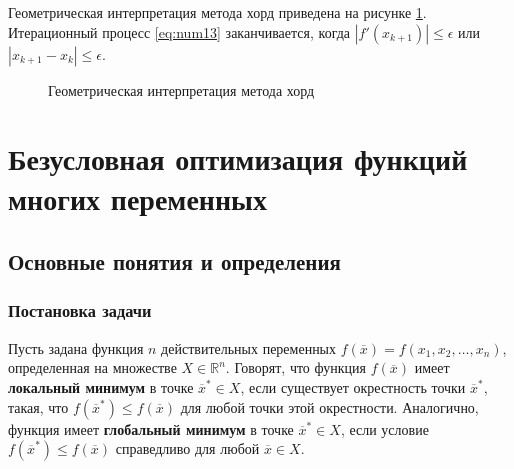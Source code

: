 \documentclass[a4paper,12pt]{report}
\begin{document}
Геометрическая интерпретация метода хорд приведена на рисунке \ref{fig:sek_example}. Итерационный процесс \eqref{eq:num13} заканчивается, когда $\left|f'(x_{k+1})\right| \leq \epsilon$ или $\left|x_{k+1}-x_{k}\right| \leq \epsilon$.

\begin{figure}[ht]
\caption{Геометрическая интерпретация метода хорд}
\label{fig:sek_example}
\end{figure}

\section{Безусловная оптимизация функций многих переменных}

\subsection{Основные понятия и определения}

\subsubsection{Постановка задачи}
Пусть задана функция $n$ действительных переменных $f(\overline{x}) = f(x_{1}, x_{2}, \ldots, x_{n})$, определенная на множестве $X \in \mathbb{R}^{n}$. Говорят, что функция $f(\overline{x})$ имеет \textbf{локальный минимум} в точке $\overline{x}^{*} \in X$, если существует окрестность точки $\overline{x}^{*}$, такая, что $f(\overline{x}^{*}) \leq f(\overline{x})$ для любой точки этой окрестности. Аналогично, функция имеет \textbf{глобальный минимум} в точке $\overline{x}^{*} \in X$, если условие $f(\overline{x}^{*}) \leq f(\overline{x})$ справедливо для любой $\overline{x} \in X$.
\end{document}
